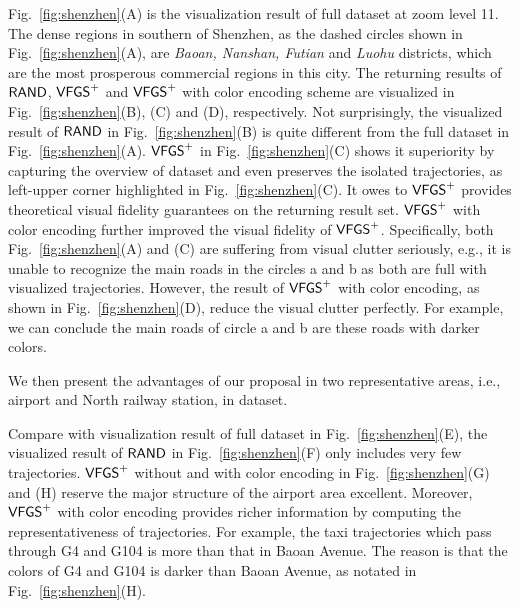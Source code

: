 Fig.~\ref{fig:shenzhen}(A) is the visualization result of full \sz{} dataset at zoom level 11.
The dense regions in southern of Shenzhen, as the dashed circles shown in Fig.~\ref{fig:shenzhen}(A), are \emph{Baoan, Nanshan, Futian} and \emph{Luohu} districts,
which are the most prosperous commercial regions in this city.
The returning results of $\mathsf{RAND}$, $\mathsf{VFGS}^{+}$ and $\mathsf{VFGS}^{+}$ with color encoding scheme are visualized in Fig.~\ref{fig:shenzhen}(B), (C) and (D), respectively.
Not surprisingly,  the visualized result of $\mathsf{RAND}$ in Fig.~\ref{fig:shenzhen}(B) is quite different from the full dataset in Fig.~\ref{fig:shenzhen}(A).
$\mathsf{VFGS}^{+}$ in Fig.~\ref{fig:shenzhen}(C) shows it superiority by capturing the overview of \sz{} dataset and even preserves the isolated trajectories, as left-upper corner highlighted in  Fig.~\ref{fig:shenzhen}(C).
It owes to $\mathsf{VFGS}^{+}$ provides theoretical visual fidelity guarantees on the returning result set.
$\mathsf{VFGS}^{+}$ with color encoding further improved the visual fidelity of $\mathsf{VFGS}^{+}$.
Specifically, both Fig.~\ref{fig:shenzhen}(A) and (C) are suffering from visual clutter seriously,
e.g., it is unable to recognize the main roads in the circles a and b as both are full with visualized trajectories.
However, the result of $\mathsf{VFGS}^{+}$ with color encoding, as shown in Fig.~\ref{fig:shenzhen}(D), reduce the visual clutter perfectly.
For example, we can conclude the main roads of circle a and b are these roads with {darker} colors.

We then present the advantages of our proposal in two representative areas, i.e., airport and North railway station, in \sz{} dataset.

Compare with visualization result of full dataset in Fig.~\ref{fig:shenzhen}(E),
the visualized result of $\mathsf{RAND}$ in Fig.~\ref{fig:shenzhen}(F) only includes very few trajectories.
$\mathsf{VFGS}^{+}$ without and with color encoding in Fig.~\ref{fig:shenzhen}(G) and (H) reserve the major structure of the airport area excellent.
Moreover, $\mathsf{VFGS}^{+}$ with color encoding provides richer information by computing the representativeness of trajectories.
For example, the taxi trajectories which pass through G4 and G104 is more than that in Baoan Avenue.
The reason is that the colors of G4 and G104 is {darker} than Baoan Avenue, as notated in Fig.~\ref{fig:shenzhen}(H).


